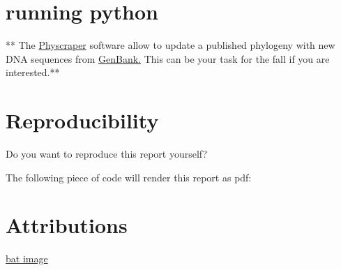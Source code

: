 \documentclass[]{article}
\begin{document}
\hypertarget{running-python}{%
\section{running python}\label{running-python}}

** The \href{https://physcraper.readthedocs.io/en/latest/}{Physcraper}
software allow to update a published phylogeny with new DNA sequences
from \href{https://www.ncbi.nlm.nih.gov/genbank/}{GenBank.} This can be
your task for the fall if you are interested.**

\hypertarget{reproducibility}{%
\section{Reproducibility}\label{reproducibility}}

Do you want to reproduce this report yourself?

The following piece of code will render this report as pdf:

\hypertarget{attributions}{%
\section{Attributions}\label{attributions}}

\href{https://unsplash.com/photos/hNz4Qh9ECCc}{bat image}
\end{document}
